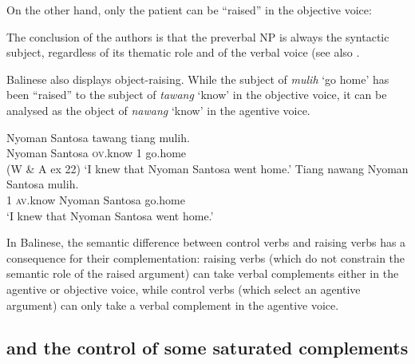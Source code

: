 \documentclass[output=paper
                ,modfonts
                ,nonflat
	        ,collection
	        ,collectionchapter
	        ,collectiontoclongg
 	        ,biblatex
                ,babelshorthands
                ,newtxmath
                ,draftmode
                ,colorlinks, citecolor=brown
]{./langsci/langscibook}
\begin{document}
On the other hand, only the patient can be ``raised'' in the objective voice:

\eal
{}
\zl

The conclusion of the authors is that the preverbal NP is always the syntactic subject, regardless of its thematic role and of the verbal voice (see also \citealt{ManningandSag1998}.

Balinese also displays object-raising. While the subject of \emph{mulih} `go home' has been ``raised'' to the
subject of \emph{tawang} `know' in the objective voice, it can be analysed as the object of \emph{nawang} `know' in the agentive
voice.

\begin{exe}
\ex \begin{xlist}
\ex 
\gll Nyoman Santosa tawang           tiang  mulih.\\
     Nyoman Santosa \textsc{ov}.know 1      go.home\\\hfill(W \& A ex 22)
\glt `I knew that Nyoman Santosa went home.'
\ex 
\gll Tiang nawang           Nyoman Santosa mulih.\\
     1     \textsc{av}.know Nyoman Santosa go.home\\
\glt `I knew that Nyoman Santosa went home.'
\end{xlist}
\end{exe}

In Balinese, the semantic difference between control verbs and raising verbs has a consequence for their complementation: raising verbs (which do not constrain the semantic role of the raised argument) can take verbal complements either in the agentive or objective voice, while control verbs (which select an agentive argument) can only take a verbal complement in the agentive voice.

\subsection{\xarg and the control of some saturated complements}
\end{document}
